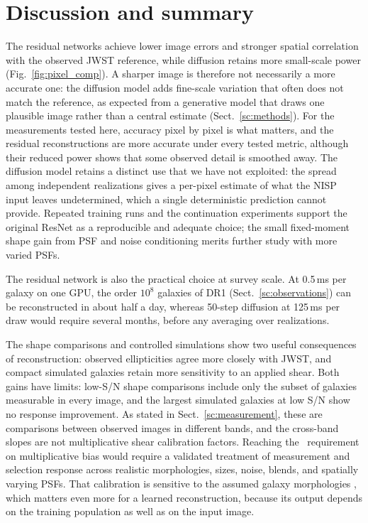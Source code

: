 \documentclass[longauth]{aa}
\begin{document}
\section{\label{sc:discussion}Discussion and summary}

The residual networks achieve lower image errors and stronger spatial correlation with the observed JWST reference, while diffusion retains more small-scale power (Fig.~\ref{fig:pixel_comp}).
A sharper image is therefore not necessarily a more accurate one: the diffusion model adds fine-scale variation that often does not match the reference, as expected from a generative model that draws one plausible image rather than a central estimate (Sect.~\ref{sc:methods}).
For the measurements tested here, accuracy pixel by pixel is what matters, and the residual reconstructions are more accurate under every tested metric, although their reduced power shows that some observed detail is smoothed away.
The diffusion model retains a distinct use that we have not exploited: the spread among independent realizations gives a per-pixel estimate of what the NISP input leaves undetermined, which a single deterministic prediction cannot provide.
Repeated training runs and the continuation experiments support the original ResNet as a reproducible and adequate choice; the small fixed-moment shape gain from PSF and noise conditioning merits further study with more varied PSFs.

The residual network is also the practical choice at survey scale.
At 0.5\,ms per galaxy on one GPU, the order $10^{8}$ galaxies of DR1 (Sect.~\ref{sc:observations}) can be reconstructed in about half a day, whereas 50-step diffusion at 125\,ms per draw would require several months, before any averaging over realizations.

The shape comparisons and controlled simulations show two useful consequences of reconstruction: observed ellipticities agree more closely with JWST, and compact simulated galaxies retain more sensitivity to an applied shear.
Both gains have limits: low-S/N shape comparisons include only the subset of galaxies measurable in every image, and the largest simulated galaxies at low S/N show no response improvement.
As stated in Sect.~\ref{sc:measurement}, these are comparisons between observed images in different bands, and the cross-band slopes are not multiplicative shear calibration factors.
Reaching the \Euclid\ requirement on multiplicative bias \citep{Cropper2013} would require a validated treatment of measurement and selection response across realistic morphologies, sizes, noise, blends, and spatially varying PSFs.
That calibration is sensitive to the assumed galaxy morphologies \citep{EC_ShapeDist2026}, which matters even more for a learned reconstruction, because its output depends on the training population as well as on the input image.
\end{document}
